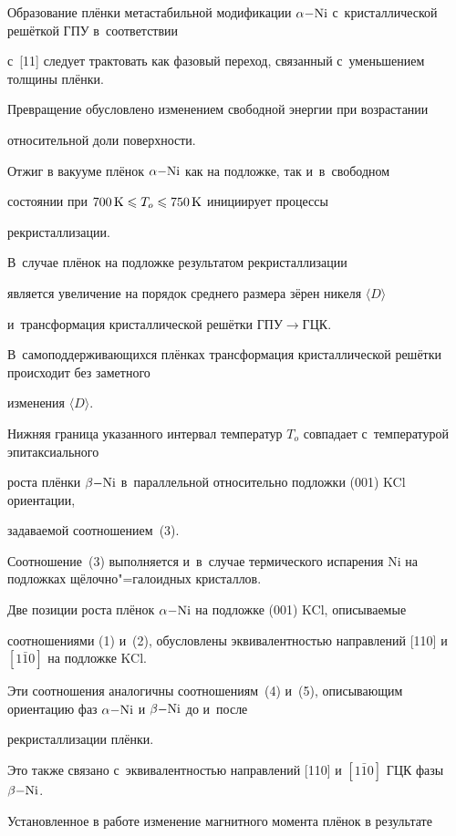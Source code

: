 Образование плёнки метастабильной модификации $\alpha \rm{-}Ni$ с~кристаллической решёткой ГПУ в~соответствии

с~[11] следует трактовать как фазовый переход, связанный с~уменьшением толщины плёнки.

Превращение обусловлено изменением свободной энергии при возрастании

относительной доли поверхности.



Отжиг в вакууме плёнок $\alpha \rm{-}Ni$ как на подложке, так и~в~свободном

состоянии при $700\,{\rm K}\leqslant T_o \leqslant 750\,\rm K$ инициирует процессы

рекристаллизации.

В~случае плёнок на подложке результатом рекристаллизации

является увеличение на порядок среднего размера зёрен никеля $\langle D\rangle$

и~трансформация кристаллической решётки ГПУ$\to $ГЦК.

В~самоподдерживающихся плёнках трансформация кристаллической решётки происходит без заметного

изменения $\langle D\rangle$.

Нижняя граница указанного интервал температур $T_o$ совпадает с~температурой эпитаксиального

роста плёнки $\beta \rm{-}Ni$ в~параллельной относительно подложки (001) KCl ориентации,

задаваемой соотношением~(3).

Соотношение~(3) выполняется и~в~случае термического испарения Ni на подложках щёлочно"=галоидных кристаллов.



Две позиции роста плёнок $\alpha \rm{-}Ni$ на подложке (001) KCl, описываемые

соотношениями (1) и~(2), обусловлены эквивалентностью направлений [110] и~$[1\bar {1}0]$ на подложке KCl.

Эти соотношения аналогичны соотношениям~(4) и~(5), описывающим ориентацию фаз $\alpha \rm{-}Ni$ и $\beta \rm{-}Ni$ до и~после

рекристаллизации плёнки.

Это также связано с~эквивалентностью направлений [110] и $[1\bar {1}0]$ ГЦК фазы $\beta \rm{-}Ni$.



Установленное в работе изменение магнитного момента плёнок в результате

